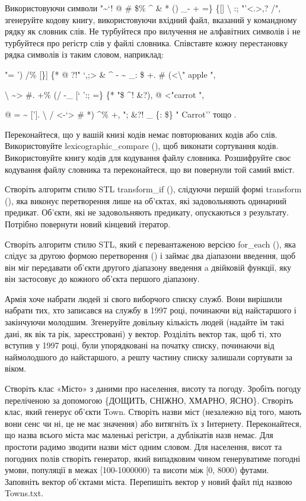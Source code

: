 \documentclass[]{article}
\begin{document}
Використовуючи символи "\textasciitilde{}`! @ \# \$\% \^{} \& * () \_- +
=\} \{{[}{]} \textbar{} \textbackslash{} :;
"'\textless{}.\textgreater{},? /", згенеруйте кодову книгу,
використовуючи вхідний файл, вказаний у командному рядку як словник
слів. Не турбуйтеся про вилучення не алфавітних символів і не турбуйтеся
про регістр слів у файлі словника. Співставте кожну перестановку рядка
символів із таким словом, наприклад:

"= ') /\% {[}\}{]} \textbar{} \{* @ ?!" `,;\textgreater{} \& \^{} -
\textasciitilde{} \_: \$ +. \# (\textless{}\textbackslash{}" apple ",

\textbar{}{]} \textbackslash{} \textasciitilde{}\textgreater{} \#. +\%
(/ -\_ {[}` ':; =\} \{* "\$ \^{}! \&?), @ \textless{}"carrot ",

@ = \textasciitilde{} {[}'{]}. \textbackslash{} /
\textless{}-`\textgreater{} \# *) \^{}\% +, "; \&?! \_ \{: \textbar{}
\$\} " Carrot'' тощо .

Переконайтеся, що у вашій книзі кодів немає повторюваних кодів або слів.
Використовуйте lexicographic\_compare (), щоб виконати сортування кодів.
Використовуйте книгу кодів для кодування файлу словника. Розшифруйте
своє кодування файлу словника та переконайтеся, що ви повернули той
самий вміст.

Створіть алгоритм стилю STL transform\_if (), слідуючи першій формі
transform (), яка виконує перетворення лише на об'єктах, які
задовольняють одинарний предикат. Об'єкти, які не задовольняють
предикату, опускаються з результату. Потрібно повернути новий кінцевий
ітератор.

Створіть алгоритм стилю STL, який є перевантаженою версією for\_each (),
яка слідує за другою формою перетворення () і займає два діапазони
введення, щоб він міг передавати об'єкти другого діапазону введення a
двійковій функції, яку він застосовує до кожного об'єкта першого
діапазону.

Армія хоче набрати людей зі свого виборчого списку служб. Вони вирішили
набрати тих, хто записався на службу в 1997 році, починаючи від
найстаршого і закінчуючи молодшим. Згенеруйте довільну кількість людей
(надайте їм такі дані, як вік та рік, зареєстровані) у вектор. Розділіть
вектор так, щоб ті, хто вступив у 1997 році, були упорядковані на
початку списку, починаючи від наймолодшого до найстаршого, а решту
частину списку залишали сортувати за віком.

Створіть клас «Місто» з даними про населення, висоту та погоду. Зробіть
погоду переліченою за допомогою \{ДОЩИТЬ, СНІЖНО, ХМАРНО, ЯСНО\}.
Створіть клас, який генерує об'єкти Town. Створіть назви міст (незалежно
від того, мають вони сенс чи ні, це не має значення) або витягніть їх з
Інтернету. Переконайтеся, що назва всього міста має маленькі регістри, а
дублікатів назв немає. Для простоти радимо зводити назви міст одним
словом. Для населення, висот та погодних полів створіть генератор, який
випадковим чином генеруватиме погодні умови, популяції в межах
{[}100-1000000) та висоти між {[}0, 8000) футами. Заповніть вектор
об'єктами міста. Перепишіть вектор у новий файл під назвою Towns.txt.
\end{document}
